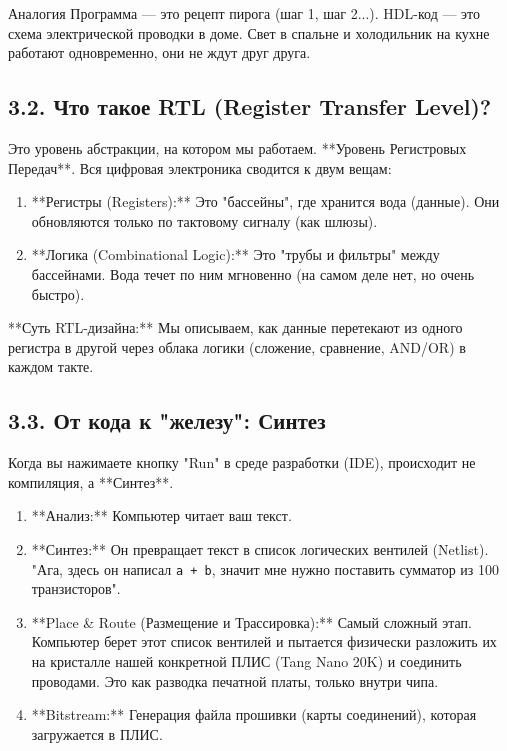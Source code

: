 \documentclass[12pt, a4paper]{article}
\begin{document}
\begin{warning}{Аналогия}
Программа — это рецепт пирога (шаг 1, шаг 2...).
HDL-код — это схема электрической проводки в доме. Свет в спальне и холодильник на кухне работают одновременно, они не ждут друг друга.
\end{warning}

\subsection{3.2. Что такое RTL (Register Transfer Level)?}
Это уровень абстракции, на котором мы работаем. **Уровень Регистровых Передач**.
Вся цифровая электроника сводится к двум вещам:
\begin{enumerate}
    \item **Регистры (Registers):** Это "бассейны", где хранится вода (данные). Они обновляются только по тактовому сигналу (как шлюзы).
    \item **Логика (Combinational Logic):** Это "трубы и фильтры" между бассейнами. Вода течет по ним мгновенно (на самом деле нет, но очень быстро).
\end{enumerate}

**Суть RTL-дизайна:** Мы описываем, как данные перетекают из одного регистра в другой через облака логики (сложение, сравнение, AND/OR) в каждом такте.

\subsection{3.3. От кода к "железу": Синтез}
Когда вы нажимаете кнопку "Run" в среде разработки (IDE), происходит не компиляция, а **Синтез**.
\begin{enumerate}
    \item **Анализ:** Компьютер читает ваш текст.
    \item **Синтез:** Он превращает текст в список логических вентилей (Netlist). "Ага, здесь он написал \texttt{a + b}, значит мне нужно поставить сумматор из 100 транзисторов".
    \item **Place \& Route (Размещение и Трассировка):** Самый сложный этап. Компьютер берет этот список вентилей и пытается физически разложить их на кристалле нашей конкретной ПЛИС (Tang Nano 20K) и соединить проводами. Это как разводка печатной платы, только внутри чипа.
    \item **Bitstream:** Генерация файла прошивки (карты соединений), которая загружается в ПЛИС.
\end{enumerate}
\end{document}
